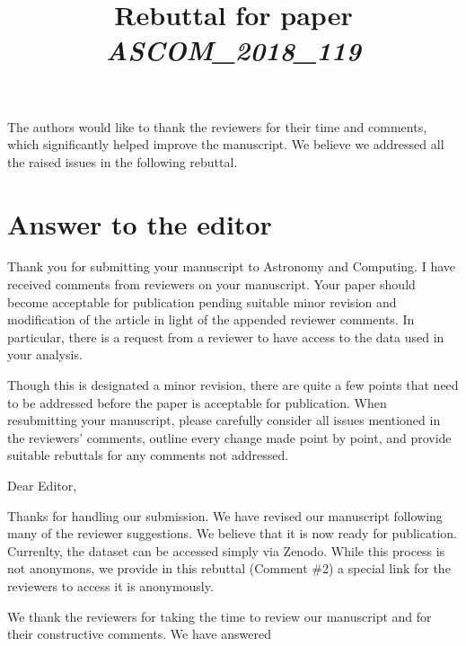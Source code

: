 \documentclass[12pt,a4paper]{article}
\title{\vspace{-1cm}
\begin{flushleft} {\sffamily Rebuttal for paper \emph{ASCOM\_2018\_119} }\end{flushleft}}
\date{\vspace{-1.7cm}\begin{flushleft}\sffamily DeepSphere: Efficient spherical Convolutional Neural Network with HEALPix sampling for cosmological applications, Nathanaël Perraudin, Michaël Defferrard, Tomasz Kacprzak, Raphael Sgier \end{flushleft}}
\newcommand{\1}{\b{1}}              %
\newcommand{\0}{\b{0}}              %
\begin{document}
\maketitle


The authors would like to thank the reviewers for their time and comments, which significantly helped improve the manuscript.
We believe we addressed all the raised issues in the following rebuttal.

\section*{Answer to the editor}


\begin{mdframed}[style=comment]
Thank you for submitting your manuscript to Astronomy and Computing. I have received comments from reviewers on your manuscript. Your paper should become acceptable for publication pending suitable minor revision and modification of the article in light of the appended reviewer comments.  In particular, there is a request from a reviewer to have access to the data used in your analysis.

Though this is designated a minor revision, there are quite a few points that need to be addressed before the paper is acceptable for publication.  When resubmitting your manuscript, please carefully consider all issues mentioned in the reviewers' comments, outline every change made point by point, and provide suitable rebuttals for any comments not addressed.
\end{mdframed}

Dear Editor,

Thanks for handling our submission. We have revised our manuscript following many of the reviewer suggestions. We believe that it is now ready for publication. Currenlty, the dataset can be accessed simply via Zenodo. While this process is not anonymons, we provide in this rebuttal (Comment \#2) a special link for the reviewers to access it is anonymously.

We thank the reviewers for taking the time to review our manuscript and for their constructive comments. We have answered


\newpage

\section{}
\end{document}
